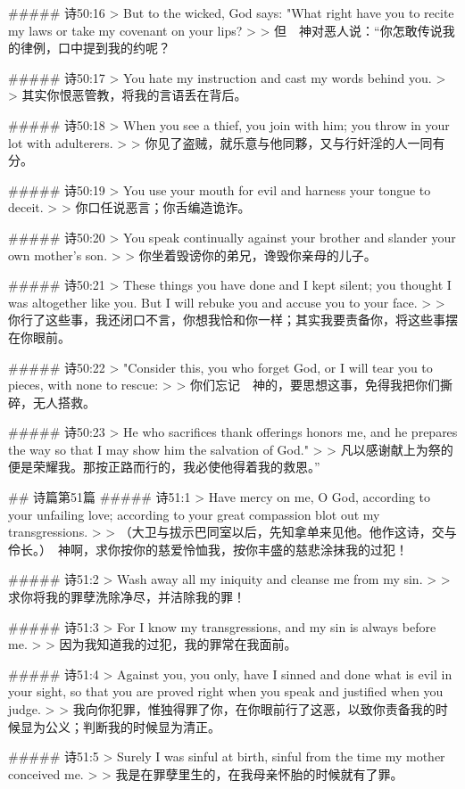 ##### 诗50:16
> But to the wicked, God says: "What right have you to recite my laws or take my covenant on your lips?
>
> 但　神对恶人说：“你怎敢传说我的律例，口中提到我的约呢？


##### 诗50:17
> You hate my instruction and cast my words behind you.
>
> 其实你恨恶管教，将我的言语丢在背后。


##### 诗50:18
> When you see a thief, you join with him; you throw in your lot with adulterers.
>
> 你见了盗贼，就乐意与他同夥，又与行奸淫的人一同有分。


##### 诗50:19
> You use your mouth for evil and harness your tongue to deceit.
>
> 你口任说恶言；你舌编造诡诈。


##### 诗50:20
> You speak continually against your brother and slander your own mother's son.
>
> 你坐着毁谤你的弟兄，谗毁你亲母的儿子。


##### 诗50:21
> These things you have done and I kept silent; you thought I was altogether like you. But I will rebuke you and accuse you to your face.
>
> 你行了这些事，我还闭口不言，你想我恰和你一样；其实我要责备你，将这些事摆在你眼前。


##### 诗50:22
> "Consider this, you who forget God, or I will tear you to pieces, with none to rescue:
>
> 你们忘记　神的，要思想这事，免得我把你们撕碎，无人搭救。


##### 诗50:23
> He who sacrifices thank offerings honors me, and he prepares the way so that I may show him the salvation of God."
>
> 凡以感谢献上为祭的便是荣耀我。那按正路而行的，我必使他得着我的救恩。”


## 诗篇第51篇
##### 诗51:1
> Have mercy on me, O God, according to your unfailing love; according to your great compassion blot out my transgressions.
>
> （大卫与拔示巴同室以后，先知拿单来见他。他作这诗，交与伶长。）　神啊，求你按你的慈爱怜恤我，按你丰盛的慈悲涂抹我的过犯！


##### 诗51:2
> Wash away all my iniquity and cleanse me from my sin.
>
> 求你将我的罪孽洗除净尽，并洁除我的罪！


##### 诗51:3
> For I know my transgressions, and my sin is always before me.
>
> 因为我知道我的过犯，我的罪常在我面前。


##### 诗51:4
> Against you, you only, have I sinned and done what is evil in your sight, so that you are proved right when you speak and justified when you judge.
>
> 我向你犯罪，惟独得罪了你，在你眼前行了这恶，以致你责备我的时候显为公义；判断我的时候显为清正。


##### 诗51:5
> Surely I was sinful at birth, sinful from the time my mother conceived me.
>
> 我是在罪孽里生的，在我母亲怀胎的时候就有了罪。


